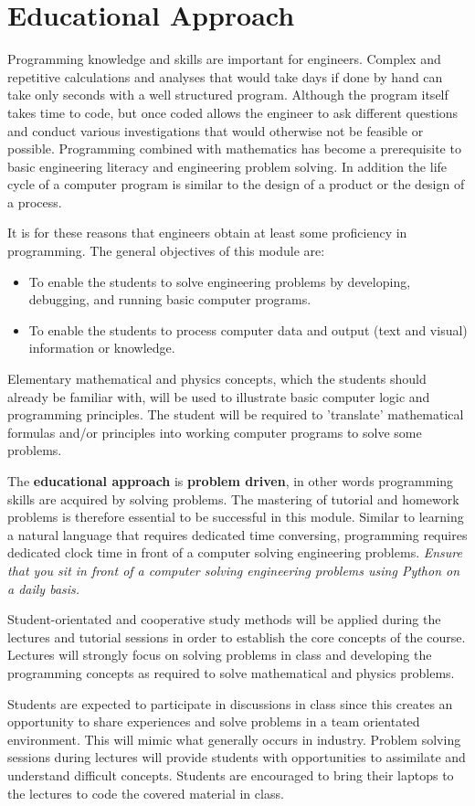 \section{Educational Approach}
Programming knowledge and skills are important for engineers. Complex
and repetitive calculations and analyses that would take days if done
by hand can take only seconds with a well structured program. Although
the program itself takes time to code, but once coded allows the
engineer to ask different questions and conduct various investigations
that would otherwise not be feasible or possible. Programming combined
with mathematics has become a prerequisite to basic engineering
literacy and engineering problem solving. In addition the life cycle
of a computer program is similar to the design of a product or the
design of a process.

It is for these reasons that engineers obtain at least some
proficiency in programming. The general objectives of this module are:
    \begin{itemize}
        \item To enable the students to solve engineering problems by
            developing, debugging, and running basic computer programs.
        \item To enable the students to process computer data and output
            (text and visual) information or knowledge.
    \end{itemize}

    Elementary mathematical and physics concepts, which the students
    should already be familiar with, will be used to illustrate basic
    computer logic and programming principles. The student will be
    required to 'translate' mathematical formulas and/or principles
    into working computer programs to solve some problems.

    The \textbf{educational approach} is \textbf{problem driven}, in
    other words programming skills are acquired by solving
    problems. The mastering of tutorial and homework problems is
    therefore essential to be successful in this module. Similar to
    learning a natural language that requires dedicated time
    conversing, programming requires dedicated clock time in front of
    a computer solving engineering problems. \textit{Ensure that you sit in
    front of a computer solving engineering problems using Python on a
    daily basis.}

  Student-orientated and cooperative study methods will be applied
  during the lectures and tutorial sessions in order to establish the
  core concepts of the course. Lectures will strongly focus on solving
  problems in class and developing the programming concepts as
  required to solve mathematical and physics problems.

  Students are expected to participate in discussions in class since
  this creates an opportunity to share experiences and solve problems
  in a team orientated environment. This will mimic what generally
  occurs in industry. Problem solving sessions during lectures will
  provide students with opportunities to assimilate and understand
  difficult concepts. Students are encouraged to bring their laptops
  to the lectures to code the covered material in class.
